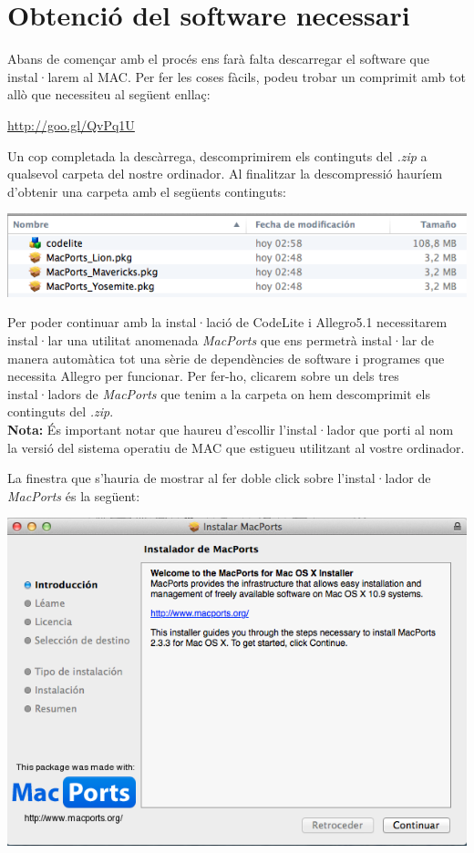 \documentclass[11pt]{article}
\begin{document}
\section{Obtenció del software necessari}
Abans de començar amb el procés ens farà falta descarregar el software que instal·larem al MAC. Per fer les coses fàcils, podeu trobar un comprimit amb tot allò que necessiteu al següent enllaç:

\begin{center}
	\url{http://goo.gl/QvPq1U}
\end{center}

\noindent Un cop completada la descàrrega, descomprimirem els continguts del \textit{.zip} a qualsevol carpeta del nostre ordinador. Al finalitzar la descompressió hauríem d'obtenir una carpeta amb el següents continguts:

\begin{center}
	\includegraphics[scale=0.5]{img/Zip_Contents.png}
\end{center}

\noindent Per poder continuar amb la instal·lació de CodeLite i Allegro5.1 necessitarem instal·lar una utilitat anomenada \textit{MacPorts} que ens permetrà instal·lar de manera automàtica tot una sèrie de dependències de software i programes que necessita Allegro per funcionar. Per fer-ho, clicarem sobre un dels tres instal·ladors de \textit{MacPorts} que tenim a la carpeta on hem descomprimit els continguts del \textit{.zip}. \\

\noindent \textbf{Nota:} És important notar que haureu d'escollir l'instal·lador que porti al nom la versió del sistema operatiu de MAC que estigueu utilitzant al vostre ordinador.

\newpage
\noindent La finestra que s'hauria de mostrar al fer doble click sobre l'instal·lador de \textit{MacPorts} és la següent:

\begin{center}
	\includegraphics[scale=0.5]{img/MacPorts_Installation.png}
\end{center}
\end{document}
